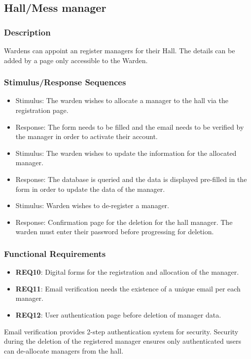 \documentclass{scrreprt}
\begin{document}
\subsection{Hall/Mess manager}
\subsubsection{Description}
Wardens can appoint an register managers for their Hall. The details can be added by a page only accessible to the Warden.
\subsubsection{Stimulus/Response Sequences}
\begin{itemize}
    \item Stimulus: The warden wishes to allocate a manager to the hall via the registration page.
    \item Response: The form needs to be filled and the email needs to be verified by the manager in order to activate their account.
\end{itemize}

\begin{itemize}
    \item Stimulus: The warden wishes to update the information for the allocated manager.
    \item Response: The database is queried and the data is displayed pre-filled in the form in order to update the data of the manager.
\end{itemize}

\begin{itemize}
    \item Stimulus: Warden wishes to de-register a manager. 
    \item Response: Confirmation page for the deletion for the hall manager. The warden must enter their password before progressing for deletion.
\end{itemize}

\subsubsection{Functional Requirements}
\begin{itemize}
    \item \textbf{REQ10}: Digital forms for the registration and allocation of the manager.
    \item \textbf{REQ11}: Email verification needs the existence of a unique email per each manager.
    \item \textbf{REQ12}: User authentication page before deletion of manager data.
\end{itemize}
Email verification provides 2-step authentication system for security. Security during the deletion of the registered manager ensures only authenticated users can de-allocate managers from the hall.
\end{document}
